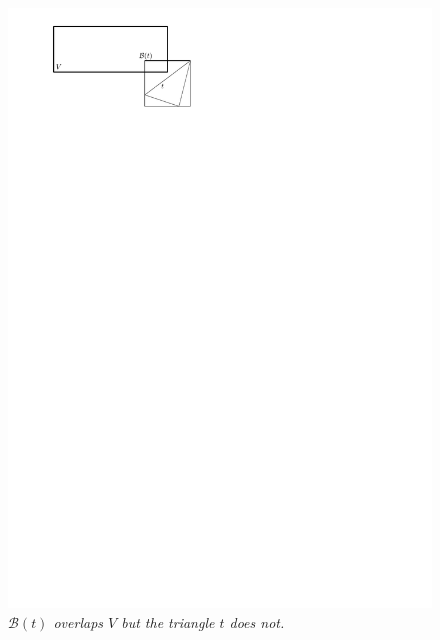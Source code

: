\documentclass[12pt]{article}
\begin{document}
\begin{figure}
\centering
\includegraphics{figs/splitClipping1}
\caption{\textit{$\mathcal{B}(t)$ overlaps $V$ but the triangle $t$ does not.}}
\label{figure:sc1}
\end{figure}
\end{document}
